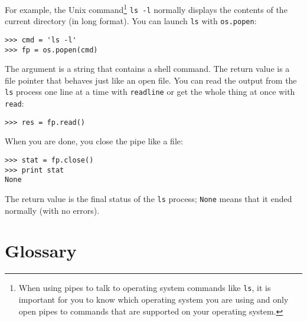 For example, the Unix command\footnote{When using pipes to talk 
to operating system commands like {\tt ls}, it is important 
for you to know which operating system you are using and only
open pipes to commands that are supported on your operating system.}
{\tt ls -l} normally displays the
contents of the current directory (in long format).  You can
launch {\tt ls} with {\tt os.popen}:


\beforeverb
\begin{verbatim}
>>> cmd = 'ls -l'
>>> fp = os.popen(cmd)
\end{verbatim}
\afterverb
%
The argument is a string that contains a shell command.  The
return value is a file pointer that behaves just like an open
file.  You can read the output from the {\tt ls} process one
line at a time with {\tt readline} or get the whole thing at
once with {\tt read}:


\beforeverb
\begin{verbatim}
>>> res = fp.read()
\end{verbatim}
\afterverb
%
When you are done, you close the pipe like a file:


\beforeverb
\begin{verbatim}
>>> stat = fp.close()
>>> print stat
None
\end{verbatim}
\afterverb
%
The return value is the final status of the {\tt ls} process;
{\tt None} means that it ended normally (with no errors).

\section{Glossary}

